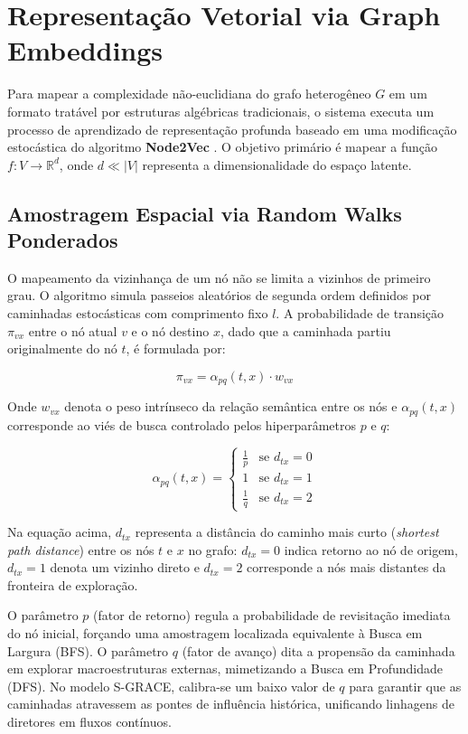 \documentclass[11pt,a4paper]{article}
\begin{document}
\section{Representação Vetorial via Graph Embeddings}

Para mapear a complexidade não-euclidiana do grafo heterogêneo $G$ em um formato tratável por
estruturas algébricas tradicionais, o sistema executa um processo de aprendizado de representação
profunda baseado em uma modificação estocástica do algoritmo \textbf{Node2Vec} \cite{node2vec}.
O objetivo primário é mapear a função $f: V \to \mathbb{R}^d$, onde $d \ll |V|$ representa a
dimensionalidade do espaço latente.

\subsection{Amostragem Espacial via Random Walks Ponderados}

O mapeamento da vizinhança de um nó não se limita a vizinhos de primeiro grau. O algoritmo simula
passeios aleatórios de segunda ordem definidos por caminhadas estocásticas com comprimento fixo
$l$. A probabilidade de transição $\pi_{vx}$ entre o nó atual $v$ e o nó destino $x$, dado que a
caminhada partiu originalmente do nó $t$, é formulada por:

\begin{equation}
\pi_{vx} = \alpha_{pq}(t, x) \cdot w_{vx}
\end{equation}

Onde $w_{vx}$ denota o peso intrínseco da relação semântica entre os nós e $\alpha_{pq}(t, x)$
corresponde ao viés de busca controlado pelos hiperparâmetros $p$ e $q$:

\begin{equation}
\alpha_{pq}(t, x) =
\begin{cases}
\frac{1}{p} & \text{se } d_{tx} = 0 \\
1           & \text{se } d_{tx} = 1 \\
\frac{1}{q} & \text{se } d_{tx} = 2
\end{cases}
\end{equation}

Na equação acima, $d_{tx}$ representa a distância do caminho mais curto (\textit{shortest path
distance}) entre os nós $t$ e $x$ no grafo: $d_{tx} = 0$ indica retorno ao nó de origem, $d_{tx}
= 1$ denota um vizinho direto e $d_{tx} = 2$ corresponde a nós mais distantes da fronteira de
exploração.

O parâmetro $p$ (fator de retorno) regula a probabilidade de revisitação imediata do nó inicial,
forçando uma amostragem localizada equivalente à Busca em Largura (BFS). O parâmetro $q$ (fator
de avanço) dita a propensão da caminhada em explorar macroestruturas externas, mimetizando a
Busca em Profundidade (DFS). No modelo S-GRACE, calibra-se um baixo valor de $q$ para garantir
que as caminhadas atravessem as pontes de influência histórica, unificando linhagens de diretores
em fluxos contínuos.
\end{document}
